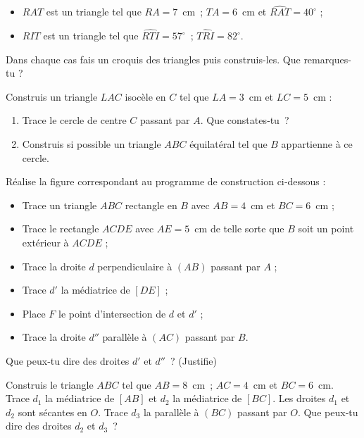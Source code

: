 \begin{exercice}
\begin{itemize}
 \item $RAT$ est un triangle tel que $RA = 7$ cm ; $TA = 6$ cm et $\widehat{RAT} = 40^\circ$ ;
 \item $RIT$ est un triangle tel que $\widehat{RTI} = 57^\circ$ ; $\widehat{TRI} = 82^\circ$.
 \end{itemize}
\vspace{-0.5cm}
Dans chaque cas fais un croquis des triangles puis construis-les. Que remarques-tu ? 
\end{exercice}


\begin{exercice}
Construis un triangle $LAC$ isocèle en $C$ tel que $LA = 3$ cm et $LC = 5$ cm :
\begin{enumerate}
 \item Trace le cercle de centre $C$ passant par $A$. Que constates‑tu ?
 \item Construis si possible un triangle $ABC$ équilatéral tel que $B$ appartienne à ce cercle.
 \end{enumerate}
\end{exercice}


\begin{exercice}
Réalise la figure correspondant au programme de construction ci‑dessous :
\begin{itemize}
 \item Trace un triangle $ABC$ rectangle en $B$ avec $AB = 4$ cm et $BC = 6$ cm ;
 \item Trace le rectangle $ACDE$ avec $AE = 5$ cm de telle sorte que $B$ soit un point extérieur à $ACDE$ ;
 \item Trace la droite $d$ perpendiculaire à $(AB)$ passant par $A$ ;
 \item Trace $d'$ la médiatrice de $[DE]$ ;
 \item Place $F$ le point d'intersection de $d$ et $d'$ ;
 \item Trace la droite $d''$ parallèle à $(AC)$ passant par $B$.
 \end{itemize}
Que peux‑tu dire des droites $d'$ et $d''$ ? (Justifie)
\end{exercice}


\begin{exercice}
Construis le triangle $ABC$ tel que $AB = 8$ cm ; $AC = 4$ cm et $BC = 6$ cm. Trace $d_1$ la médiatrice de $[AB]$ et $d_2$ la médiatrice de $[BC]$. Les droites $d_1$ et $d_2$ sont sécantes en $O$. Trace $d_3$ la parallèle à $(BC)$ passant par $O$. Que peux‑tu dire des droites $d_2$ et $d_3$ ?
\end{exercice}


